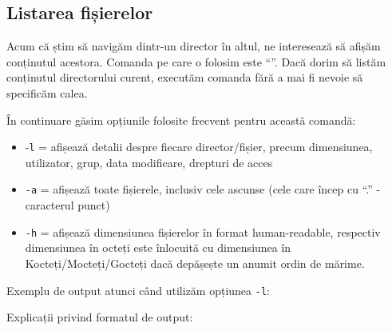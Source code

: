 \subsection{Listarea fișierelor}
\label{sec:file-system-file-list}

Acum că știm să navigăm dintr-un director în altul, ne interesează să afișăm
conținutul acestora.  Comanda pe care o folosim este “”. Dacă dorim să listăm conținutul directorului curent, executăm comanda
 fără a mai fi nevoie să specificăm calea.

În continuare găsim opțiunile folosite frecvent pentru această comandă:


\begin{itemize}
	\item -\texttt{l}  = afișează detalii despre fiecare director/fișier,
		precum dimensiunea, utilizator, grup, data modificare, drepturi
		de acces
	\item \texttt{-a} = afișează toate fișierele, inclusiv cele ascunse (cele
		care încep cu “.” - caracterul punct)
	\item \texttt{-h} = afișează dimensiunea fișierelor în format
		human-readable, respectiv dimensiunea în octeți este înlocuită
		cu dimensiunea în Kocteți/Mocteți/Gocteți dacă depășește un
		anumit ordin de mărime.
\end{itemize}


Exemplu de output atunci când utilizăm opțiunea \texttt{-l}:


Explicații privind formatul de output:


